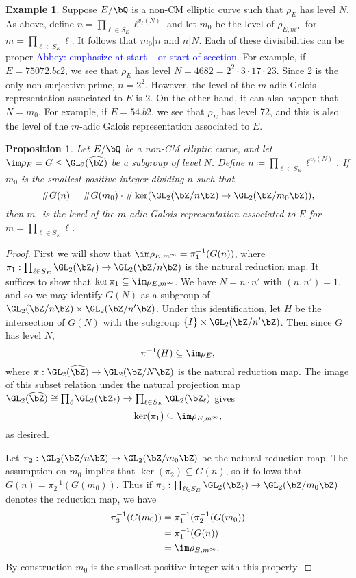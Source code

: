 \documentclass[11pt,reqno]{amsart}
\theoremstyle{plain}
\newtheorem{proposition}[theorem]{Proposition}
\theoremstyle{definition}
\newtheorem{example}[theorem]{Example}
\newcommand{\Q}{\bQ}
\newcommand{\Z}{\bZ}
\newcommand{\abbey}[1]{\textcolor{blue}{Abbey: #1}}
\begin{document}
  \begin{example}
Suppose $E/\Q$ is a non-CM elliptic curve such that $\rho_{E}$ has level $N$. As above, define $n=\prod_{\ell \in S_E} \ell^{v_{\ell}(N)}$ and let $m_0$ be the level of $\rho_{E,m^{\infty}}$ for $m= \prod_{\ell \in S_E} \ell$. It follows that $m_0| n$ and $n | N$. Each of these divisibilities can be proper \abbey{emphasize at start -- or start of secction}. For example, if $E=75072.bc2$, we see that $\rho_E$ has level $N=4682=2^2 \cdot 3 \cdot 17 \cdot 23$. Since 2 is the only non-surjective prime, $n=2^2$. However, the level of the $m$-adic Galois representation associated to $E$ is 2. On the other hand, it can also happen that $N=m_0$. For example, if $E=54.b2$, we see that $\rho_E$ has level 72, and this is also the level of the $m$-adic Galois representation associated to $E$.
\end{example}
  \begin{proposition}
  Let $E/\Q$ be a non-CM elliptic curve, and let $\im \rho_E=G \leq \GL_2(\widehat{\Z})$ be a subgroup of level $N$. Define $n \coloneqq \prod_{\ell \in S_E} \ell^{v_{\ell}(N)}$. If $m_0$ is the smallest positive integer dividing $n$ such that \[\#G(n)=\#G(m_0) \cdot \#\ker(\GL_2(\Z/n\Z) \rightarrow \GL_2(\Z/m_0\Z)),\] then $m_0$ is the level of the $m$-adic Galois representation associated to $E$ for $m= \prod_{\ell \in S_E} \ell$.
  \end{proposition}
  \begin{proof}
  First we will show that $\im \rho_{E,m^{\infty}}=\pi_1^{-1}(G(n))$, where $\pi_1:\prod_{\ell \in S_E} \GL_2(\Z_{\ell}) \rightarrow \GL_2(\Z/n\Z)$ is the natural reduction map. It suffices to show that $\ker \pi_1 \subseteq \im \rho_{E,m^{\infty}}$. We have $N=n\cdot n'$ with $(n,n')=1$, and so we may identify $G(N)$ as a subgroup of $\GL_2(\Z/n\Z) \times \GL_2(\Z/n'\Z)$. Under this identification, let $H$  be the intersection of $G(N)$ with the subgroup $\{I\} \times \GL_2(\Z/n'\Z)$. Then since $G$ has level $N$,
  \[
  \pi^{-1}(H) \subseteq \im \rho_E,
  \]
  where $\pi: \GL_2(\widehat{\Z}) \rightarrow \GL_2(\Z/N\Z)$ is the natural reduction map. The image of this subset relation under the natural projection map  $\GL_2(\widehat{\Z}) \cong \prod_{\ell} \GL_2(\Z_{\ell}) \rightarrow  \prod_{\ell \in S_E} \GL_2(\Z_{\ell}) $ gives
  \[
  \ker(\pi_1) \subseteq \im \rho_{E,m^{\infty}},
  \]
  as desired.

Let $\pi_2: \GL_2(\Z/n\Z) \rightarrow \GL_2(\Z/m_0\Z)$ be the natural reduction map. The assumption on $m_0$ implies that $\ker(\pi_2) \subseteq G(n)$, so it follows that $G(n) = \pi_2^{-1}(G(m_0))$. Thus if $\pi_3: \prod_{\ell \in S_E} \GL_2(\Z_{\ell}) \rightarrow \GL_2(\Z/m_0\Z)$ denotes the reduction map, we have
  \begin{align*}
  \pi_3^{-1}(G(m_0))&=\pi_1^{-1}(\pi_2^{-1}(G(m_0))\\
  &=\pi_1^{-1}(G(n))\\
  &=\im \rho_{E,m^{\infty}}.
  \end{align*}
By construction $m_0$ is the smallest positive integer with this property.
  \end{proof}
\end{document}
